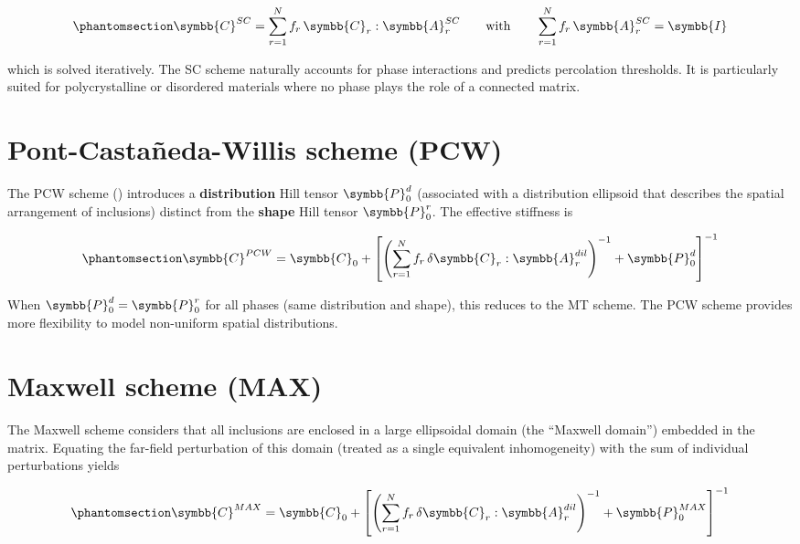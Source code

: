 \documentclass[
  a4paper,
  numbers=noendperiod,
  DIV=12]{scrreprt}
\newcommand{\uuuu}[1]{{\symbb{{#1}}}}
\begin{document}
\begin{equation}\protect\phantomsection\label{eq-C-sc}{
\uuuu{C}^{SC} = \sum_{r=1}^{N} f_r \, \uuuu{C}_r : \uuuu{A}_r^{SC}
\qquad\text{with}\qquad
\sum_{r=1}^{N} f_r \, \uuuu{A}_r^{SC} = \uuuu{I}
}\end{equation}

which is solved iteratively. The SC scheme naturally accounts for phase
interactions and predicts percolation thresholds. It is particularly
suited for polycrystalline or disordered materials where no phase plays
the role of a connected matrix.

\section{Pont-Castañeda-Willis scheme (PCW)}\label{sec-pcw-deriv}

The PCW scheme () introduces a
\textbf{distribution} Hill tensor \(\uuuu{P}_0^d\) (associated with a
distribution ellipsoid that describes the spatial arrangement of
inclusions) distinct from the \textbf{shape} Hill tensor
\(\uuuu{P}_0^r\). The effective stiffness is

\begin{equation}\protect\phantomsection\label{eq-C-pcw}{
\uuuu{C}^{PCW} = \uuuu{C}_0 + \left[\left(\sum_{r=1}^{N} f_r \, \delta\uuuu{C}_r : \uuuu{A}_r^{dil}\right)^{-1} + \uuuu{P}_0^d\right]^{-1}
}\end{equation}

When \(\uuuu{P}_0^d = \uuuu{P}_0^r\) for all phases (same distribution
and shape), this reduces to the MT scheme. The PCW scheme provides more
flexibility to model non-uniform spatial distributions.

\section{Maxwell scheme (MAX)}\label{sec-max-deriv}

The Maxwell scheme considers that all inclusions are enclosed in a large
ellipsoidal domain (the ``Maxwell domain'') embedded in the matrix.
Equating the far-field perturbation of this domain (treated as a single
equivalent inhomogeneity) with the sum of individual perturbations
yields

\begin{equation}\protect\phantomsection\label{eq-C-max}{
\uuuu{C}^{MAX} = \uuuu{C}_0 + \left[\left(\sum_{r=1}^{N} f_r \, \delta\uuuu{C}_r : \uuuu{A}_r^{dil}\right)^{-1} + \uuuu{P}_0^{MAX}\right]^{-1}
}\end{equation}
\end{document}

